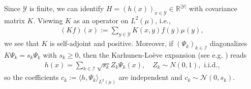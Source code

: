 \documentclass[letterpaper,11pt]{article}
\numberwithin{equation}{section}
\renewcommand{\geq}{\geqslant}
\numberwithin{equation}{section}
\begin{document}
Since $\mathcal{Y}$ is finite, we can identify $H=(h(x))_{x\in \mathcal{Y}}\in \mathbb{R}^{|\mathcal{Y}|}$ with covariance matrix $K$. Viewing $K$ as an operator on $L^2(\mu)$, i.e.,  
\begin{align*}
    (Kf)(x):=\sum_{y\in \mathcal{Y}} K(x,y) f(y)\mu(y),
\end{align*}
we see that $K$ is self-adjoint and positive. Moreover, if $(\Psi_k)_{k\in \mathcal{I}}$ diagonalizes $K\Psi_k =s_k \Psi_k$ with $s_k\geq 0$, then the Karhunen-Lo\`eve expansion (see e.g. \cite{williams2006gaussian}) reads
\begin{align*}
    h(x)=\sum_{k\in \mathcal{I}} \sqrt{s_k} Z_k \Psi_k(x),\quad Z_k\sim N(0,1),\text{ i.i.d.,} 
\end{align*}
so the coefficients $c_k :=\langle h,\Psi_k \rangle_{L^2(\mu)}$ are independent and $c_k \sim \mathcal{N}(0,s_k)$.



\end{document}
